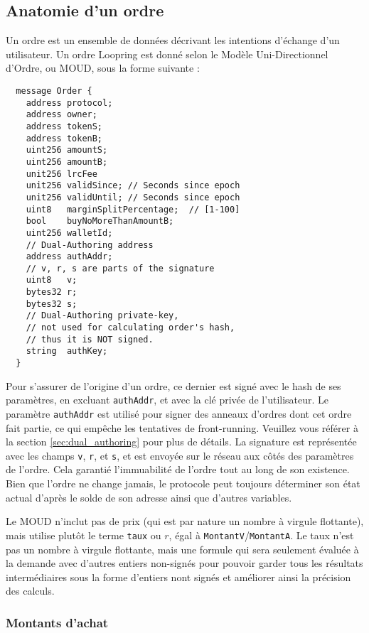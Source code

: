 \documentclass[UTF8,nofonts]{article}
\begin{document}
\begin{multicols}{2}
\subsection{Anatomie d'un ordre\label{anatomy}}
Un ordre est un ensemble de données décrivant les intentions d'échange d'un utilisateur. Un ordre Loopring est donné selon le Modèle Uni-Directionnel d'Ordre, ou MOUD, sous la forme suivante :

\begin{verbatim}
  message Order {
    address protocol;
    address owner;
    address tokenS;  
    address tokenB;
    uint256 amountS;
    uint256 amountB;
    unit256 lrcFee
    unit256 validSince; // Seconds since epoch
    unit256 validUntil; // Seconds since epoch
    uint8   marginSplitPercentage;  // [1-100]
    bool    buyNoMoreThanAmountB;
    uint256 walletId;
    // Dual-Authoring address
    address authAddr;
   	// v, r, s are parts of the signature
    uint8   v;       
    bytes32 r;
    bytes32 s;
    // Dual-Authoring private-key,
    // not used for calculating order's hash,
    // thus it is NOT signed.
    string  authKey;          
  }
\end{verbatim}


Pour s'assurer de l'origine d'un ordre, ce dernier est signé avec le hash de ses paramètres, en excluant \verb|authAddr|, et avec la clé privée de l'utilisateur. Le paramètre \verb|authAddr| est utilisé pour signer des anneaux d'ordres dont cet ordre fait partie, ce qui empêche les tentatives de front-running. Veuillez vous référer à la section \ref{sec:dual_authoring} pour plus de détails. La signature est représentée avec les champs \verb|v|, \verb|r|, et \verb|s|, et est envoyée sur le réseau aux côtés des paramètres de l'ordre. Cela garantié l'immuabilité de l'ordre tout au long de son existence. Bien que l'ordre ne change jamais, le protocole peut toujours déterminer son état actual d'après le solde de son adresse ainsi que d'autres variables.


Le MOUD n'inclut pas de prix (qui est par nature un nombre à virgule flottante), mais utilise plutôt le terme \verb|taux| ou $r$, égal à \verb|MontantV|/\verb|MontantA|. Le taux n'est pas un nombre à virgule flottante, mais une formule qui sera seulement évaluée à la demande avec d'autres entiers non-signés pour pouvoir garder tous les résultats intermédiaires sous la forme d'entiers nont signés et améliorer ainsi la précision des calculs. 

\subsubsection{Montants d'achat}


\end{multicols}
\end{document}
